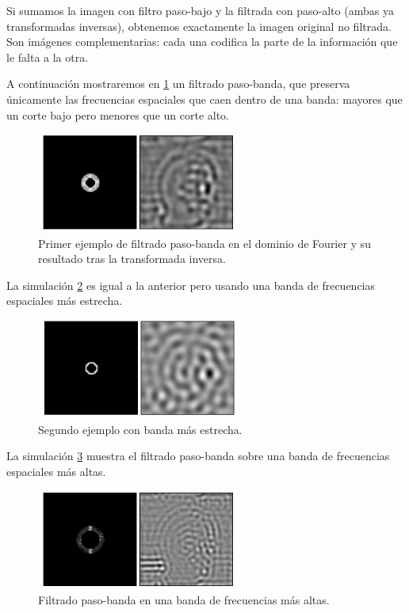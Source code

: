 Si sumamos la imagen con filtro paso-bajo y la filtrada con paso-alto (ambas ya transformadas inversas), obtenemos exactamente la imagen original no filtrada. Son imágenes complementarias: cada una codifica la parte de la información que le falta a la otra.


A continuación mostraremos en \ref{fig:pasabanda1} un filtrado paso-banda, que preserva únicamente las frecuencias espaciales que caen dentro de una banda: mayores que un corte bajo pero menores que un corte alto.

\begin{figure}[!htbp]
    \centering
    \includegraphics[width=0.6\textwidth]{img/f8.png}
    \caption{Primer ejemplo de filtrado paso-banda en el dominio de Fourier y su resultado tras la transformada inversa.}
    \label{fig:pasabanda1}
\end{figure}

La simulación \ref{fig:pasabanda2} es igual a la anterior pero usando una banda de frecuencias espaciales más estrecha.

\begin{figure}[!htbp]
    \centering
    \includegraphics[width=0.6\textwidth]{img/f9.png}
    \caption{Segundo ejemplo con banda más estrecha.}
    \label{fig:pasabanda2}
\end{figure}

La simulación \ref{fig:pasabanda3} muestra el filtrado paso-banda sobre una banda de frecuencias espaciales más altas.

\begin{figure}[!htbp]
    \centering
    \includegraphics[width=0.6\textwidth]{img/f10.png}
    \caption{Filtrado paso-banda en una banda de frecuencias más altas.}
    \label{fig:pasabanda3}
\end{figure}

